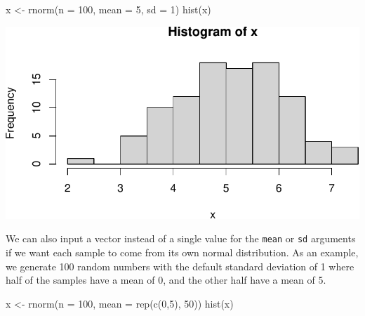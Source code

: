 \documentclass[
  letterpaper,
]{latex/krantz}
\makeatletter
\newenvironment{Shaded}{\begin{snugshade}}{\end{snugshade}}
\newcommand{\AttributeTok}[1]{\textcolor[rgb]{0.40,0.45,0.13}{#1}}
\newcommand{\DecValTok}[1]{\textcolor[rgb]{0.68,0.00,0.00}{#1}}
\newcommand{\FunctionTok}[1]{\textcolor[rgb]{0.28,0.35,0.67}{#1}}
\newcommand{\NormalTok}[1]{\textcolor[rgb]{0.00,0.23,0.31}{#1}}
\newcommand{\OtherTok}[1]{\textcolor[rgb]{0.00,0.23,0.31}{#1}}
\newenvironment{kframe}{%
\medskip{}
\setlength{\fboxsep}{.8em}
 \def\at@end@of@kframe{}%
 \ifinner\ifhmode%
  \def\at@end@of@kframe{\end{minipage}}%
  \begin{minipage}{\columnwidth}%
 \fi\fi%
 \def\FrameCommand##1{\hskip\@totalleftmargin \hskip-\fboxsep
 \colorbox{shadecolor}{##1}\hskip-\fboxsep
     \hskip-\linewidth \hskip-\@totalleftmargin \hskip\columnwidth}%
 \MakeFramed {\advance\hsize-\width
   \@totalleftmargin\z@ \linewidth\hsize
   \@setminipage}}%
 {\par\unskip\endMakeFramed%
 \at@end@of@kframe}
\renewenvironment{Shaded}{\begin{kframe}}{\end{kframe}}
\makeatother
\begin{document}
\begin{Shaded}
\begin{Highlighting}[]
\NormalTok{x }\OtherTok{\textless{}{-}} \FunctionTok{rnorm}\NormalTok{(}\AttributeTok{n =} \DecValTok{100}\NormalTok{, }\AttributeTok{mean =} \DecValTok{5}\NormalTok{, }\AttributeTok{sd =} \DecValTok{1}\NormalTok{)}
\FunctionTok{hist}\NormalTok{(x)}
\end{Highlighting}
\end{Shaded}

\begin{center}
\includegraphics[width=1\textwidth,height=\textheight]{book/distributions_files/figure-pdf/unnamed-chunk-4-1.pdf}
\end{center}

We can also input a vector instead of a single value for the
\texttt{mean} or \texttt{sd} arguments if we want each sample to come
from its own normal distribution. As an example, we generate 100 random
numbers with the default standard deviation of 1 where half of the
samples have a mean of 0, and the other half have a mean of 5.

\begin{Shaded}
\begin{Highlighting}[]
\NormalTok{x }\OtherTok{\textless{}{-}} \FunctionTok{rnorm}\NormalTok{(}\AttributeTok{n =} \DecValTok{100}\NormalTok{, }\AttributeTok{mean =} \FunctionTok{rep}\NormalTok{(}\FunctionTok{c}\NormalTok{(}\DecValTok{0}\NormalTok{,}\DecValTok{5}\NormalTok{), }\DecValTok{50}\NormalTok{))}
\FunctionTok{hist}\NormalTok{(x)}
\end{Highlighting}
\end{Shaded}
\end{document}
